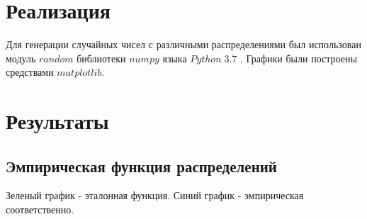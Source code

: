 \documentclass[a4]{article}
\begin{document}
	\section{Реализация}
	Для генерации случайных чисел с различными распределениями был использован модуль $random$ библиотеки $numpy$ языка $Python\;3.7$ . Графики были построены средствами $matplotlib$.
	\newpage
	\section{Результаты}
		\subsection{Эмпирическая функция распределений}
		Зеленый график - эталонная функция. Синий график - эмпирическая соответственно.
		\begin{center}
			

\end{center}
\end{document}
